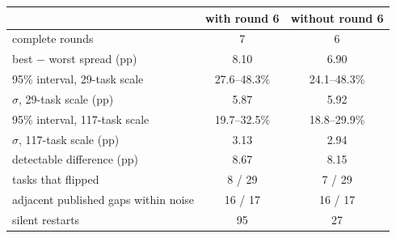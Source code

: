 \begin{tabular}{lcc}
\toprule
& with round 6 & without round 6 \\
\midrule
complete rounds & 7 & 6 \\
best $-$ worst spread (pp) & 8.10 & 6.90 \\
95\% interval, 29-task scale & 27.6--48.3\% & 24.1--48.3\% \\
$\sigma$, 29-task scale (pp) & 5.87 & 5.92 \\
95\% interval, 117-task scale & 19.7--32.5\% & 18.8--29.9\% \\
$\sigma$, 117-task scale (pp) & 3.13 & 2.94 \\
detectable difference (pp) & 8.67 & 8.15 \\
tasks that flipped & 8 / 29 & 7 / 29 \\
adjacent published gaps within noise & 16 / 17 & 16 / 17 \\
silent restarts & 95 & 27 \\
\bottomrule
\end{tabular}
